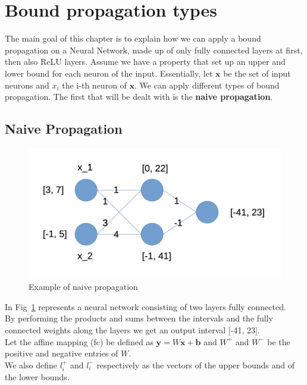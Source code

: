 \section{Bound propagation types}
\label{sec:bp_types}

The main goal of this chapter is to explain how we can apply a bound propagation on a Neural Network, made up of only fully connected layers at first, then also ReLU layers. Assume we have a property that set up an upper and lower bound for each neuron of the input. Essentially, let $\textbf{x}$ be the set of input neurons and $x_i$ the i-th neuron of $\textbf{x}$.
We can apply different types of bound propagation. The first that will be dealt with is the \textbf{naive propagation}. 

\subsection{Naive Propagation}

\begin{figure}[t]
	\caption{\label{fig:naive_prop} Example of naive propagation}
	\centering
	\includegraphics[scale= 0.3]{Chapter5/img/bound-propagation/naive_prop.png}
\end{figure}

In Fig~\ref{fig:naive_prop} represents a neural network consisting of two layers fully connected.\\
By performing the products and sums between the intervals and the fully connected weights along the layers we get an output interval [-41, 23].\\
Let the affine mapping (fc) be defined as  $\textbf{y} = W\textbf{x} + \textbf{b}$
and $W^+$ and $W^-$ be the positive and negative entries of $W$.\\
We also define $l^{+}_i$ and $l^{-}_i$ respectively as the vectors of the upper bounds and of the lower bounds.  

